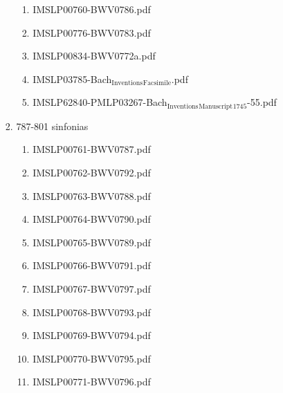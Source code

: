 \documentclass[11pt]{article}
\begin{document}
\begin{enumerate}
\begin{enumerate}
\begin{enumerate}
\begin{enumerate}
\item IMSLP00760-BWV0786.pdf
\label{sec-1-1-1-1-44-6-4-2-1-14}

\item IMSLP00776-BWV0783.pdf
\label{sec-1-1-1-1-44-6-4-2-1-15}

\item IMSLP00834-BWV0772a.pdf
\label{sec-1-1-1-1-44-6-4-2-1-16}

\item IMSLP03785-Bach$_{\text{Inventions}}$$_{\text{Facsimile}}$.pdf
\label{sec-1-1-1-1-44-6-4-2-1-17}

\item IMSLP62840-PMLP03267-Bach$_{\text{Inventions}}$$_{\text{Manuscript}}$$_{\text{1745}}$-55.pdf
\label{sec-1-1-1-1-44-6-4-2-1-18}
\end{enumerate}

\item 787-801 sinfonias
\label{sec-1-1-1-1-44-6-4-2-2}
\begin{enumerate}
\item IMSLP00761-BWV0787.pdf
\label{sec-1-1-1-1-44-6-4-2-2-1}

\item IMSLP00762-BWV0792.pdf
\label{sec-1-1-1-1-44-6-4-2-2-2}

\item IMSLP00763-BWV0788.pdf
\label{sec-1-1-1-1-44-6-4-2-2-3}

\item IMSLP00764-BWV0790.pdf
\label{sec-1-1-1-1-44-6-4-2-2-4}

\item IMSLP00765-BWV0789.pdf
\label{sec-1-1-1-1-44-6-4-2-2-5}

\item IMSLP00766-BWV0791.pdf
\label{sec-1-1-1-1-44-6-4-2-2-6}

\item IMSLP00767-BWV0797.pdf
\label{sec-1-1-1-1-44-6-4-2-2-7}

\item IMSLP00768-BWV0793.pdf
\label{sec-1-1-1-1-44-6-4-2-2-8}

\item IMSLP00769-BWV0794.pdf
\label{sec-1-1-1-1-44-6-4-2-2-9}

\item IMSLP00770-BWV0795.pdf
\label{sec-1-1-1-1-44-6-4-2-2-10}

\item IMSLP00771-BWV0796.pdf
\label{sec-1-1-1-1-44-6-4-2-2-11}


\end{enumerate}
\end{enumerate}
\end{enumerate}
\end{enumerate}
\end{document}
